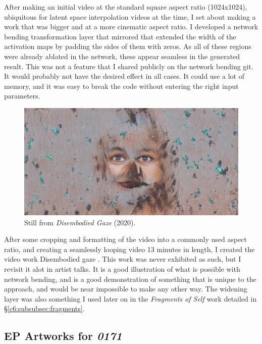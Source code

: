 After making an initial video at the standard square aspect ratio (1024x1024), ubiquitous for latent space interpolation videos at the time, I set about making a work that was bigger and at a more cinematic aspect ratio. 
I developed a network bending transformation layer that mirrored that extended the width of the activation maps by padding the sides of them with zeros. 
As all of these regions were already ablated in the network, these appear seamless in the generated result. 
This was not a feature that I shared publicly on the network bending git. It would probably not have the desired effect in all cases. 
It could use a lot of memory, and it was easy to break the code without entering the right input parameters.

\begin{figure}[!htb]
    \centering
    \captionsetup{justification=centering}
    \includegraphics[width=1\textwidth]{figures/c7_impact/disembodied_gaze.png}
    \caption{Still from \textit{Disembodied Gaze} (2020).}
    \label{fig:c7:disembodied-gaze-wide}
\end{figure}

After some cropping and formatting of the video into a commonly used aspect ratio, and creating a seamlessly looping video 13 minutes in length, I created the video work Disembodied gaze \citep{broad2020disembodied}. 
This work was never exhibited as such, but I revisit it alot in artist talks. 
It is a good illustration of what is possible with network bending, and is a good demonstration of something that is unique to the approach, and would be near impossible to make any other way. 
The widening layer was also something I used later on in the \textit{Fragments of Self} work detailed in \S \ref{c6:subsubsec:fragments}.

\subsection{EP Artworks for \textit{0171}}

